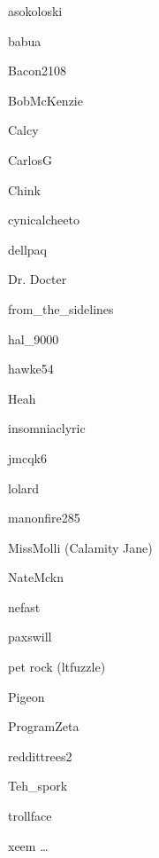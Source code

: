 \begin{multicols}{3}
asokoloski

babua

Bacon2108

BobMcKenzie

Calcy

CarlosG

Chink

cynicalcheeto

dellpaq

Dr. Docter

from\_the\_sidelines

hal\_9000

hawke54

Heah

insomniaclyric

jmcqk6

lolard

manonfire285

MissMolli (Calamity Jane)

NateMckn

nefast

paxswill

pet rock (ltfuzzle)

Pigeon

ProgramZeta

reddittrees2

Teh\_spork

trollface

xeem
  \ldots
\end{multicols}